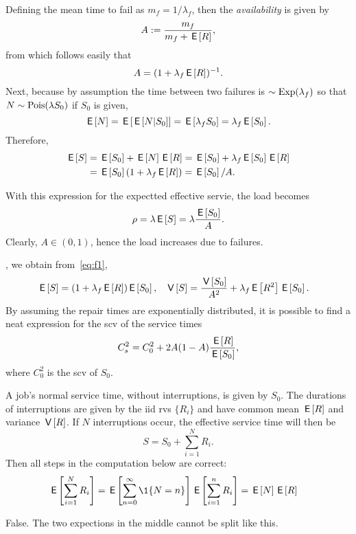 \documentclass[stochastic-or.tex]{subfiles}
\begin{document}
Defining the mean time to fail as $m_{f} = 1/\lambda_f$, then the  \emph{availability} is given by
\begin{equation*}
 A:=\frac{m_f}{m_f + \,\mathsf{E}\left[R\right]},
\end{equation*}
from which follows  easily that
\begin{equation}\label{eq:91}
A=(1+\lambda_f \,\mathsf{E}\left[R\right])^{-1}.
\end{equation}
Next, because by assumption the time between two failures is $\sim \mathrm{Exp}(\lambda_{f})$ so that $N\sim \mathrm{Pois}(\lambda S_{0})$ if $S_{0}$ is given,
\begin{equation}
\label{eq:38}
\,\mathsf{E}\left[N\right] = \,\mathsf{E}\left[\,\mathsf{E}\left[N|S_{0}\right]\right] = \,\mathsf{E}\left[\lambda_{f}S_{0}\right] = \lambda_{f} \,\mathsf{E}\left[S_{0}\right].
\end{equation}
Therefore,
 \begin{align*}
   \,\mathsf{E}\left[S\right] &= \,\mathsf{E}\left[S_0\right] + \,\mathsf{E}\left[N\right] \,\mathsf{E}\left[R\right] = \,\mathsf{E}\left[S_0\right] + \lambda_f \,\mathsf{E}\left[S_0\right] \,\mathsf{E}\left[R\right] \\\
   &= \,\mathsf{E}\left[S_0\right](1+\lambda_f \,\mathsf{E}\left[R\right]) = \,\mathsf{E}\left[S_{0}\right]/A.
 \end{align*}

With this expression for the expectted effective servie, the load becomes
\begin{equation*}
\rho = \lambda \,\mathsf{E}\left[S\right] = \lambda \frac{\,\mathsf{E}\left[S_0\right]}A.
\end{equation*}
Clearly, $A\in (0,1)$, hence the load increases due to failures.

, we obtain from~\cref{eq:f1},
 \begin{align}\label{eq:f2}
\,\mathsf{E}\left[S\right] &= (1+\lambda_f \,\mathsf{E}\left[R\right]) \,\mathsf{E}\left[S_0\right], & \,\mathsf{V}\left[S\right] &= \frac{\,\mathsf{V}\left[S_0\right]}{A^2} + \lambda_f \,\mathsf{E}\left[R^2\right] \,\mathsf{E}\left[S_0\right].
 \end{align}
By assuming the repair times are exponentially distributed, it is possible to find a neat expression for the scv of the service times
\begin{equation}\label{eq:f3}
 C_s^2 = C_0^2 + 2 A(1-A) \frac{\,\mathsf{E}\left[R\right]}{\,\mathsf{E}\left[S_0\right]},
\end{equation}
where $C_0^2$ is the scv of $S_0$.

\begin{truefalse}
A job's normal service time, without interruptions, is given by $S_0$.
The durations of interruptions are given by the iid rvs $\{R_i\}$ and have common mean $\,\mathsf{E}\left[R\right]$ and variance $\,\mathsf{V}\left[R\right]$.
If $N$ interruptions occur, the effective service time will then be
\begin{equation*}
S= S_0 + \sum_{i=1}^N R_i.
\end{equation*}
Then all steps in the computation below are correct:
\begin{align*}
 \E{\sum_{i=1}^N R_i}
&= \E{ \sum_{n=0}^\infty \1{N=n}} \E{ \sum_{i=1}^n R_i } = \E N \E R
\end{align*}
\begin{solution} False. The two expections in the middle cannot be split like this.
\end{solution}
\end{truefalse}
\end{document}

